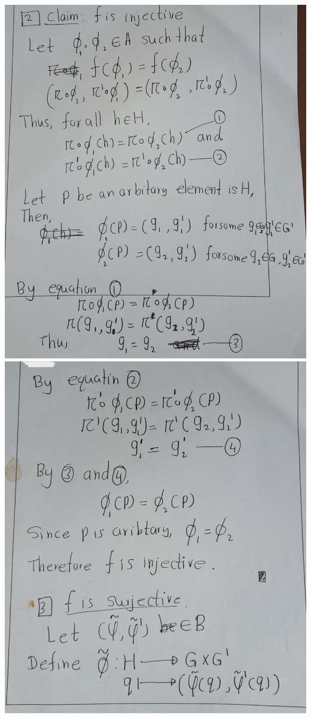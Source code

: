 \documentclass[
]{book}
\theoremstyle{definition}
\theoremstyle{definition}
\theoremstyle{definition}
\theoremstyle{definition}
\theoremstyle{remark}
\begin{document}
\includegraphics{figures/ch_2/fig13.jpg}
\includegraphics{figures/ch_2/fig14.jpg}
\end{document}
